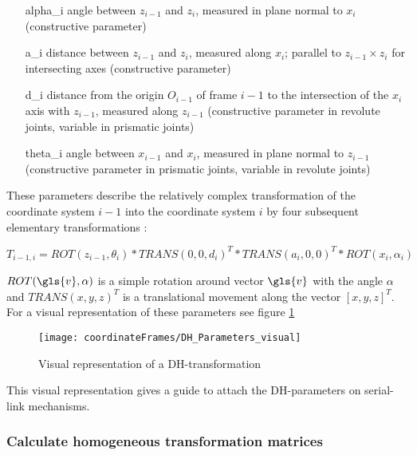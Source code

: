 \begin{enumerate}[label=\emph{\arabic*)}]
	\item[\gls{alpha_i}] angle between $z_{i-1}$ and $z_i$, measured in plane normal to $x_i$ (constructive parameter)
	\item[\gls{a_i}] distance between $z_{i-1}$ and $z_i$, measured along $x_i$; parallel to $z_{i-1} \times z_i$ for intersecting axes (constructive parameter)
	\item[\gls{d_i}] distance from the origin $O_{i-1}$ of frame $i-1$ to the intersection of the $x_i$ axis with $z_{i-1}$, measured along $z_{i-1}$ (constructive parameter in revolute joints, variable in prismatic joints)
	\item[\gls{theta_i}] angle between $x_{i-1}$ and $x_i$, measured in plane normal to $z_{i-1}$ (constructive parameter in prismatic joints, variable in revolute joints)
\end{enumerate}

These parameters describe the relatively complex transformation of the coordinate system $i-1$ into the coordinate system $i$ by four subsequent elementary transformations \cite{allgInvKin}:

\begin{equation} \label{eq:DH-Transform}
T_{i-1,i}=ROT(z_{i-1}, \theta_i) * TRANS(0,0,d_i)^T * TRANS(a_i,0,0)^T * ROT(x_i,\alpha_i)
\end{equation}

$ROT(\gls{v},\alpha)$ is a simple rotation around vector $\gls{v}$ with the angle $\alpha$ and $TRANS(x,y,z)^T$ is a translational movement along the vector $[x,y,z]^T$. For a visual representation of these parameters see figure \ref{fig:DH_Parameters_visual} 

\begin{figure}[H]
	\texttt{[image: coordinateFrames/DH\_Parameters\_visual]}
	\caption{Visual representation of a \ac{DH}-transformation}
	\label{fig:DH_Parameters_visual}
\end{figure}

This visual representation gives a guide to attach the \ac{DH}-parameters on serial-link mechanisms.


\subsubsection{Calculate homogeneous transformation matrices}

